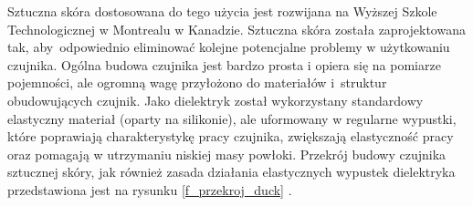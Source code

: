 Sztuczna skóra dostosowana do tego użycia jest rozwijana na Wyższej Szkole Technologicznej w Montrealu w Kanadzie. Sztuczna skóra została zaprojektowana tak, aby~odpowiednio eliminować kolejne potencjalne problemy w użytkowaniu czujnika. Ogólna budowa czujnika jest bardzo prosta i opiera się na pomiarze pojemności, ale ogromną wagę przyłożono do materiałów i~struktur obudowujących czujnik. Jako dielektryk został wykorzystany standardowy elastyczny materiał (oparty na silikonie), ale uformowany w regularne wypustki, które poprawiają charakterystykę pracy czujnika, zwiększają elastyczność pracy oraz pomagają w utrzymaniu niskiej masy powłoki. 
Przekrój budowy czujnika sztucznej skóry, jak również zasada działania elastycznych wypustek dielektryka przedstawiona jest na rysunku \ref{f_przekroj_duck} \cite{b_konf_kaczka_przekroj}.



